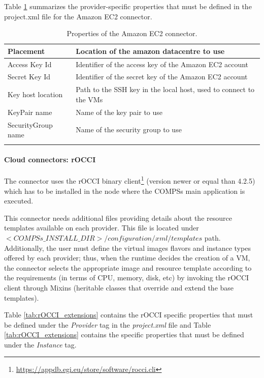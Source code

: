 \newpage

Table \ref{tab:ec2_connector_properties} summarizes the provider-specific properties that must be 
defined in the project.xml file for the Amazon EC2 connector.
\bgroup
  \def\arraystretch{1.5}
  \begin{longtable}{| p{} | p{} |}
  \hline
  \textbf{Placement}  &   Location of the amazon datacentre to use \\ \hline
  Access Key Id       &   Identifier of the access key of the Amazon EC2 account \\ \hline
  Secret Key Id       &   Identifier of the secret key of the Amazon EC2 account \\ \hline
  Key host location   &   Path to the SSH key in the local host, used to connect to the VMs \\ \hline
  KeyPair name        &   Name of the key pair to use \\ \hline
  SecurityGroup name  &   Name of the security group to use \\ \hline
  
  \caption{Properties of the Amazon EC2 connector.}
  \label{tab:ec2_connector_properties}
  \end{longtable}
\egroup

\paragraph{Cloud connectors: rOCCI}
The connector uses the rOCCI binary client\footnote{\url{https://appdb.egi.eu/store/software/rocci.cli}} 
(version newer or equal than 4.2.5) which has to be installed in the node where the COMPSs main 
application is executed.

This connector needs additional files providing details about the resource templates available on 
each provider. This file is located under $<COMPSs\_INSTALL\_DIR>/configuration/xml/templates$ path.
Additionally, the user must define the virtual images flavors and instance types offered by each provider; 
thus, when the runtime decides the creation of a VM, the connector selects the appropriate image and 
resource template according to the requirements (in terms of CPU, memory, disk, etc) by invoking the 
rOCCI client through Mixins (heritable classes that override and extend the base templates).

Table \ref{tab:rOCCI_extensions} contains the rOCCI specific properties that must be defined under the \textit{Provider} tag in
the \textit{project.xml} file and Table \ref{tab:rOCCI_extensions} contains the specific properties that must be defined
under the \textit{Instance} tag.

